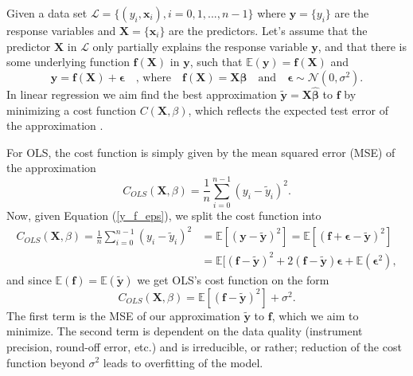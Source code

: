 \documentclass[]{article}
\begin{document}
Given a data set $\mathcal{L} = \{(y_i, \mathbf{x}_i), i=0,1,...,n-1\}$ where $\mathbf{y} = \{y_i\}$ are the response variables and $\mathbf{X} = \{\mathbf{x}_i\}$ are the predictors. Let's assume that the predictor $\mathbf{X}$ in $\mathcal{L}$ only partially explains the response variable $\mathbf{y}$, and that there is some underlying function $\mathbf{f}(\mathbf{X})$ in $\mathbf{y}$, such that $\mathbb{E}(\mathbf{y}) = \mathbf{f}(\mathbf{X})$ and
\begin{equation}
\label{y_f_eps}
\mathbf{y} = \mathbf{f}(\mathbf{X}) + \mathbf{\epsilon} \quad \text{, where} \quad \mathbf{f}(\mathbf{X}) = \mathbf{X} \mathbf{\beta} \quad \text{and} \quad \mathbf{\epsilon} \sim \mathcal{N}(0, \sigma^2).
\end{equation}
In linear regression we aim find the best approximation $\mathbf{\tilde{y}} = \mathbf{X\hat{\beta}}$ to $\mathbf{f}$ by minimizing a cost function $C(\mathbf{X},\mathbb{\beta})$, which reflects the expected test error of the approximation \cite{james2013introduction}.

For OLS, the cost function is simply given by the mean squared error (MSE) of the approximation
\begin{equation}
	C_{OLS}(\mathbf{X},\mathbb{\beta}) = \frac{1}{n} \sum_{i=0}^{n-1} (y_i - \tilde{y}_i)^2.
\end{equation}
Now, given Equation (\ref{y_f_eps}), we split the cost function into
\begin{equation*}
\begin{aligned}
	C_{OLS}(\mathbf{X},\mathbb{\beta}) = \frac{1}{n} \sum_{i=0}^{n-1} (y_i - \tilde{y}_i)^2 &= \mathbb{E}[(\mathbf{y} - \mathbf{\tilde{y}})^2] = \mathbb{E}[(\mathbf{f} + \mathbf{\epsilon} - \mathbf{\tilde{y}})^2] \\
	&= \mathbb{E}[(\mathbf{f} - \mathbf{\tilde{y}})^2 + 2(\mathbf{f} - \mathbf{\tilde{y}})\mathbf{\epsilon} + \mathbb{E}(\mathbf{\epsilon}^2),
\end{aligned}
\end{equation*}
and since $\mathbb{E}(\mathbf{f}) = \mathbb{E}(\mathbf{\tilde{y}})$ we get OLS's cost function on the form \cite{james2013introduction}
\begin{equation}
\label{red-irred}
	C_{OLS}(\mathbf{X},\mathbb{\beta}) = \mathbb{E}[(\mathbf{f} - \mathbf{\tilde{y}})^2] + \sigma^2.
\end{equation}
The first term is the MSE of our approximation $\mathbf{\tilde{y}}$ to $\mathbf{f}$, which we aim to minimize. The second term is dependent on the data quality (instrument precision, round-off error, etc.) and is irreducible, or rather; reduction of the cost function beyond $\sigma^2$ leads to overfitting of the model.
\end{document}
